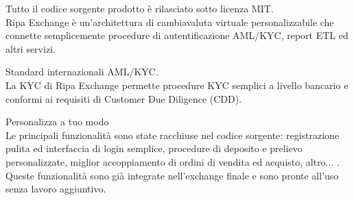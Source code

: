 \documentclass[11pt,fleqn]{book} %
\begin{document}
\begin{tcolorbox}[featureBox,
	title=\textsc{Open Source} \faCircleONotch]

	\small	Tutto il codice sorgente prodotto è rilasciato sotto licenza MIT.\\\vspace{5mm}
	\tiny Ripa Exchange è un'architettura di cambiavaluta virtuale personalizzabile che connette semplicemente procedure
	di autentificazione AML/KYC, report ETL ed altri servizi.
\end{tcolorbox}
\begin{tcolorbox}[featureBox,
	title=\textsc{Conforme} \faCheck]

	\small Standard internazionali AML/KYC.\\\vspace{5mm}
	\tiny La KYC di Ripa Exchange permette procedure KYC semplici a livello bancario e conformi ai requisiti di 
	Customer Due Diligence (CDD).
\end{tcolorbox}
\begin{tcolorbox}[featureBox,
	title=\textsc{Trasparente e Configurabile} \faCogs]

	\small Personalizza a tuo modo\\\vspace{5mm}
	\tiny Le principali funzionalità sono state racchiuse nel codice sorgente: registrazione pulita ed 
	interfaccia di login semplice, procedure di deposito e prelievo personalizzate, miglior accoppiamento di ordini 
	di vendita ed acquisto, altro... . Queste funzionalità sono già integrate nell'exchange finale e sono pronte all'uso
	senza lavoro aggiuntivo. 
\end{tcolorbox}
\end{document}
